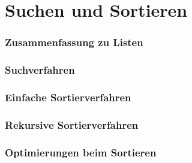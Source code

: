 \documentclass{beamer}
\subtitle{Such- und Sortierverfahren}
\begin{document}
\maketitle

\part{Suchen und Sortieren}

\section{Zusammenfassung zu Listen}
    

\section{Suchverfahren}
	

\section{Einfache Sortierverfahren}
	
\section{Rekursive Sortierverfahren}
	
\section{Optimierungen beim Sortieren}
	
\end{document}
